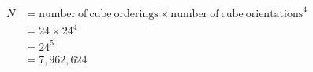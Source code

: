 \documentclass[preview, border=2mm]{standalone}
\begin{document}
\vspace*{\fill}

{\fontsize{32pt}{40pt}\selectfont
	\begin{align*}
	N
		&= \mathrm{number\ of\ cube\ orderings} \times \mathrm{number\ of\ cube\ orientations}^4 \\
		&= 24 \times 24^4 \\
		&= 24^5 \\
		&= 7,962,624
	\end{align*}
}

\vspace*{\fill}
\end{document}
